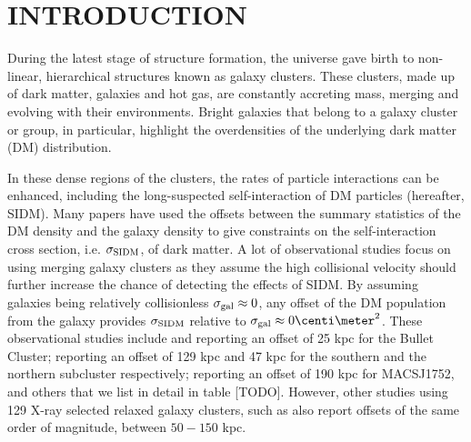 
\section{INTRODUCTION} 
During the latest stage of structure formation, the universe gave birth to
non-linear, hierarchical structures known as galaxy clusters. 
These clusters, made up of dark matter, galaxies and hot gas,
are constantly accreting mass, merging and evolving with their
environments. Bright galaxies that belong to a galaxy cluster or group, in 
particular, highlight the overdensities of the underlying dark matter (DM) 
distribution. 


In these dense regions of the clusters, the rates of particle
interactions can be enhanced, including the long-suspected self-interaction of DM
particles (hereafter, SIDM).  
Many papers have used the offsets between the summary statistics of the DM
density and the galaxy density to give constraints on 
the self-interaction cross
section, i.e. $\sigma_{\rm SIDM}$, of dark matter. 
A lot of observational studies focus on using merging galaxy clusters
as they assume the high collisional velocity should further increase the chance
of detecting the effects of SIDM.
By assuming galaxies being relatively collisionless $\sigma_{\rm gal} \approx 0$, 
any offset of the DM population from the galaxy provides $\sigma_{\rm SIDM}$ 
relative to $\sigma_{\rm gal} \approx 0 \centi\meter^2$. 
These observational studies include \cite{Markevitch2004} and \cite{Bradac2006b}  
reporting an offset of 25 kpc for the Bullet Cluster;  
\cite{Dawson2013} reporting an offset of 129 kpc and 47 kpc for the southern
and the northern subcluster respectively;
\cite{Jee2015} reporting an offset of 190 kpc for MACSJ1752, and others that we
list in detail in table [TODO].
However, other studies using 129 X-ray selected relaxed galaxy clusters, 
such as \cite{George2012a} also report offsets of the same order of magnitude,
between $50 - 150$ kpc. 

